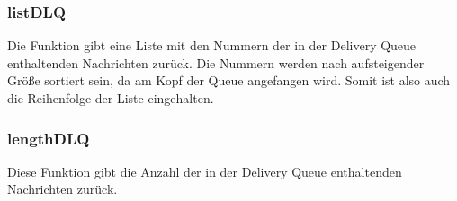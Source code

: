 \subsubsection{listDLQ}

Die Funktion gibt eine Liste mit den Nummern der in der Delivery Queue enthaltenden Nachrichten zurück. Die Nummern werden nach aufsteigender Größe sortiert sein, da am Kopf der Queue angefangen wird. Somit ist also auch die Reihenfolge der Liste eingehalten. 

\subsubsection{lengthDLQ}

Diese Funktion gibt die Anzahl der in der Delivery Queue enthaltenden Nachrichten zurück. 